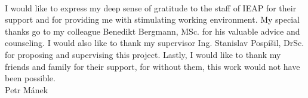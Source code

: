 \documentclass[11pt,twoside,a4paper]{book}
\newcommand\FirstandFamilyName{Petr Mánek}																							%
\begin{document}
	
	\translate					%


	\coverpagestarts

	\newpage~
	~
	\newpage


	\acknowledgements
	\noindent
	I would like to express my deep sense of gratitude to the staff of IEAP for their support and for providing me with stimulating working environment. My special thanks go to my colleague Benedikt Bergmann, MSc. for his valuable advice and counseling. I would also like to thank my supervisor Ing. Stanislav Pospíšil, DrSc. for proposing and supervising this project. Lastly, I would like to thank my friends and family for their support, for without them, this work would not have been possible.
	\\[15mm]

	\hfill\FirstandFamilyName
\end{document}
